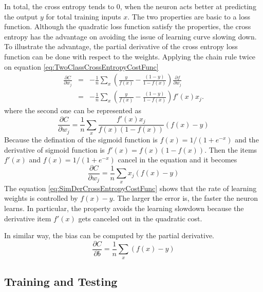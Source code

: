 In total, the cross entropy tends to $0$, when the neuron acts better at predicting the output $y$ for total training inputs $x$. The two properties are basic to a loss function. Although the quadratic loss function satisfy the properties, the cross entropy has the advantage on avoiding the issue of learning curve slowing down. To illustrate the advantage, the partial derivative of the cross entropy loss function can be done with respect to the weights. Applying the chain rule twice on equation \ref{eq:TwoClassCrossEntropyCostFunc}
\begin{eqnarray}\label{eq:DerCrossEntropyCostFunc}
  \frac{\partial C}{\partial w_j} & = & -\frac{1}{n} \sum_x \left(
    \frac{y }{f(x)} -\frac{(1-y)}{1-f(x)} \right)
  \frac{\partial f}{\partial w_j} \\
 & = & -\frac{1}{n} \sum_x \left( 
    \frac{y}{f(x)}-\frac{(1-y)}{1-f(x)} \right)f'(x) x_j.
\end{eqnarray}
where the second one can be represented as
\begin{equation}\label{eq:SecondDerCrossEntropyCostFunc}
  \frac{\partial C}{\partial w_j} = \frac{1}{n}  \sum_x \frac{f'(x) x_j}{f(x) (1-f(x))} (f(x)-y)
\end{equation}
Because the defination of the sigmoid function is $f(x) =1/(1+e^{-x})$ and the derivative of sigmoid function is $f'(x) =f(x)(1-f(x))$. Then the items $f'(x)$ and $f(x) =1/(1+e^{-x})$ cancel in the equation and it becomes
\begin{equation}\label{eq:SimDerCrossEntropyCostFunc}
 \frac{\partial C}{\partial w_j} =  \frac{1}{n} \sum_x x_j(f(x)-y)
\end{equation}
The equation \ref{eq:SimDerCrossEntropyCostFunc} shows that the rate of learning weights is controlled by $f(x) - y$. The larger the error is, the faster the neuron learns. In particular, the property avoids the learning slowdown because the derivative item $f'(x)$ gets canceled out in the quadratic cost.

In similar way, the bias can be computed by the partial derivative.
\begin{equation}\label{eq:BiasCrossEntropyCostFunc}
\frac{\partial C}{\partial b} = \frac{1}{n} \sum_x (f(x)-y)
\end{equation}


\subsection{Training and Testing}

